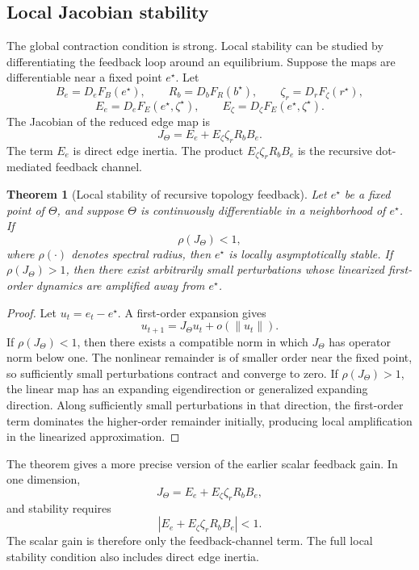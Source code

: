 \documentclass[11pt]{article}
\newtheorem{theorem}{Theorem}
\theoremstyle{remark}
\begin{document}
\subsection{Local Jacobian stability}\label{local-jacobian-stability}

The global contraction condition is strong. Local stability can be studied by differentiating the feedback loop around an equilibrium. Suppose the maps are differentiable near a fixed point \(e^\star\). Let
\[
B_e=D_eF_B(e^\star),\qquad R_b=D_bF_R(b^\star),\qquad \zeta_r=D_rF_\zeta(r^\star),
\]
\[
E_e=D_eF_E(e^\star,\zeta^\star),\qquad E_\zeta=D_\zeta F_E(e^\star,\zeta^\star).
\]
The Jacobian of the reduced edge map is
\[
J_\Theta=E_e+E_\zeta \zeta_r R_b B_e.
\]
The term \(E_e\) is direct edge inertia. The product \(E_\zeta \zeta_r R_b B_e\) is the recursive dot-mediated feedback channel.

\begin{theorem}[Local stability of recursive topology feedback]\label{thm:local-stability-recursive-topology-feedback}
Let \(e^\star\) be a fixed point of \(\Theta\), and suppose \(\Theta\) is continuously differentiable in a neighborhood of \(e^\star\). If
\[
\rho(J_\Theta)<1,
\]
where \(\rho(\cdot)\) denotes spectral radius, then \(e^\star\) is locally asymptotically stable. If \(\rho(J_\Theta)>1\), then there exist arbitrarily small perturbations whose linearized first-order dynamics are amplified away from \(e^\star\).
\end{theorem}

\begin{proof}
Let \(u_t=e_t-e^\star\). A first-order expansion gives
\[
u_{t+1}=J_\Theta u_t+o(\|u_t\|).
\]
If \(\rho(J_\Theta)<1\), then there exists a compatible norm in which \(J_\Theta\) has operator norm below one. The nonlinear remainder is of smaller order near the fixed point, so sufficiently small perturbations contract and converge to zero. If \(\rho(J_\Theta)>1\), the linear map has an expanding eigendirection or generalized expanding direction. Along sufficiently small perturbations in that direction, the first-order term dominates the higher-order remainder initially, producing local amplification in the linearized approximation.
\end{proof}

The theorem gives a more precise version of the earlier scalar feedback gain. In one dimension,
\[
J_\Theta=E_e+E_\zeta \zeta_r R_b B_e,
\]
and stability requires
\[
|E_e+E_\zeta \zeta_r R_b B_e|<1.
\]
The scalar gain is therefore only the feedback-channel term. The full local stability condition also includes direct edge inertia.
\end{document}
